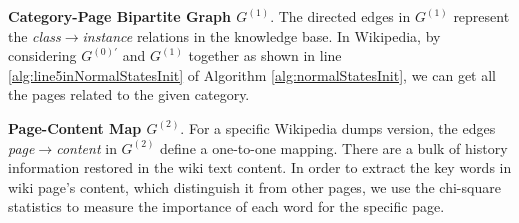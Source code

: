 \documentclass{article}
\begin{document}
\textbf{Category-Page Bipartite Graph \(G^{(1)}\)}. 
The directed edges in \(G^{(1)}\) represent the \textit{class}\(\rightarrow\)\textit{instance} relations in the knowledge base.
In Wikipedia, by considering \(G^{(0)'}\) and \(G^{(1)}\) together as shown in line \ref{alg:line5inNormalStatesInit} of Algorithm \ref{alg:normalStatesInit}, we can get all the pages related to the given category. 

\textbf{Page-Content Map \(G^{(2)}\)}. 
For a specific Wikipedia dumps version, the edges \textit{page}\(\rightarrow\)\textit{content} in \(G^{(2)}\) define a one-to-one mapping.
There are a bulk of history information restored in the wiki text content.
In order to extract the key words in wiki page's content, which distinguish it from other pages, we use the chi-square statistics\cite{yang1997comparative}\cite{liu2009imbalanced} to measure the importance of each word for the specific page.
\end{document}
